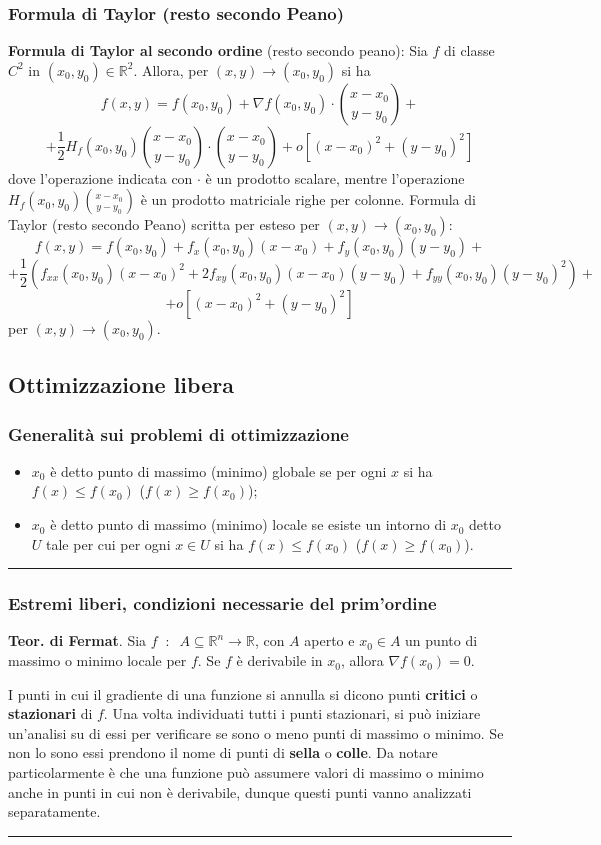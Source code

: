 \subsubsection{Formula di Taylor (resto secondo Peano)}
\textbf{Formula di Taylor al secondo ordine} (resto secondo peano):\newline
Sia $f$ di classe $C^2$ in $(x_0,y_0) \in \mathbb{R}^2$. Allora, per $(x,y) \rightarrow  (x_0, y_0)$ si ha 
\[
    f(x,y) = f(x_0,y_0) + \nabla f(x_0,y_0) \cdot \binom{x-x_0}{y-y_0} + 
\]
\[
    +\frac{1}{2} H_f(x_0,y_0) \binom{x-x_0}{y-y_0} \cdot \binom{x-x_0}{y-y_0} + o[(x-x_0)^2 + (y-y_0)^2]
\]
dove l'operazione indicata con $\cdot $ è un prodotto scalare, mentre l'operazione $H_f(x_0,y_0) \binom{x-x_0}{y-y_0}$ è un prodotto matriciale righe per colonne.
\newline
\newline
Formula di Taylor (resto secondo Peano) scritta per esteso per $(x,y) \rightarrow  (x_0,y_0)$:
\[
    f(x,y) = f(x_0, y_0) + f_x(x_0,y_0)(x-x_0) + f_y(x_0,y_0)(y-y_0) +
\]
\[
    + \frac{1}{2}\left( f_{xx}(x_0,y_0)(x-x_0)^2 + 2f_{xy}(x_0,y_0)(x-x_0)(y-y_0) + f_{yy}(x_0,y_0)(y-y_0)^2 \right) +
\]
\[
    + o[(x-x_0)^2 + (y-y_0)^2]
\]
per $(x,y) \rightarrow (x_0,y_0)$.
\subsection{Ottimizzazione libera}
\subsubsection{Generalità sui problemi di ottimizzazione}
\begin{itemize}
\item $x_0$ è detto punto di massimo (minimo) globale se per ogni $x$ si ha $f(x) \leq f(x_0)$ ($f(x) \geq f(x_0)$);
    \item $x_0$ è detto punto di massimo (minimo) locale se esiste un intorno di $x_0$ detto $U$ tale per cui per ogni $x \in U$ si ha $f(x) \leq f(x_0)$ ($f(x) \geq f(x_0)$).
\end{itemize}
\rule{\textwidth}{0.4pt}
\subsubsection{Estremi liberi, condizioni necessarie del prim'ordine}
\textbf{Teor. di Fermat}. Sia $f \;\;:\;\; A \subseteq \mathbb{R}^n \rightarrow \mathbb{R}$, con $A$ aperto e $x_0 \in A$ un punto di massimo o minimo locale per $f$. Se $f$ è derivabile in $x_0$, allora $\nabla f(x_0) = 0$.\newline
\begin{tcolorbox}
    I punti in cui il gradiente di una funzione si annulla si dicono punti \textbf{critici} o \textbf{stazionari} di $f$. Una volta individuati tutti i punti stazionari, si può iniziare un'analisi su di essi per verificare se sono o meno punti di massimo o minimo. Se non lo sono essi prendono il nome di punti di \textbf{sella} o \textbf{colle}. Da notare particolarmente è che una funzione può assumere valori di massimo o minimo anche in punti in cui non è derivabile, dunque questi punti vanno analizzati separatamente.
\end{tcolorbox}
\rule{\textwidth}{0.4pt}
